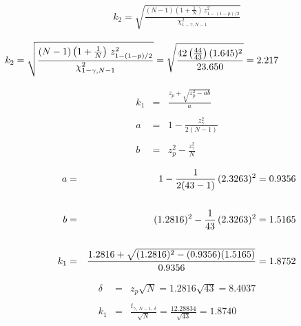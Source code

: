 \documentclass[12pt]{article}
\begin{document}
\pagestyle{empty}
\Large
{}
\pagecolor{ehandbook}

\boldmath 

\vspace*{-1.75in}

\begin{eqnarray*}
k_2 = \sqrt{\frac{(N-1)\left(1 + \frac{1}{N}\right) \, z^2_{1-(1-p)/2}}{\chi^2_{1-\gamma, N-1}}}
\end{eqnarray*}

\vspace*{.25in}

\begin{eqnarray*}
\hspace*{-1in}
k_2 = \sqrt{\frac{(N-1)\left(1 + \frac{1}{N}\right) \, z^2_{1-(1-p)/2}}{\chi^2_{1-\gamma, N-1}}} =\sqrt{\frac{42\left(\frac{44}{43}\right) (1.645)^2}{23.650}} = 2.217
\end{eqnarray*}

\vspace*{.25in}

\begin{eqnarray*}
k_{1} & = & \frac{z_{p} + \sqrt{z_{p}^2 - ab}} {a} \\
      &   & \\
a & = & 1 - \frac{z_{\gamma}^2}{2(N-1)}  \\
      &   & \\
b & = & z_{p}^2 - \frac{ z_{\gamma}^2}{N} \,
\end{eqnarray*}

\vspace*{.25in}

\begin{eqnarray*}
\hspace*{-2in}
a     & = & 1 - \frac{1}{2(43-1)} \, (2.3263)^2 = 0.9356\\
      &   &    \\
b     & = & (1.2816)^2 - \frac{1}{43} \, (2.3263)^2 = 1.5165\\
      &   &    \\
k_{1} & = & \frac{1.2816 + \sqrt{(1.2816)^2 - (0.9356)(1.5165)}} {0.9356} = 1.8752 
\end{eqnarray*}

\vspace*{.25in}

\begin{eqnarray*}
\delta & = & z_{p} \sqrt{N} = 1.2816 \sqrt{43} = 8.4037 \\
       &   & \\
k_1      & = & \frac{ t_{\gamma, \, N-1, \, \delta} }{ \sqrt{N} } = \frac{12.28834}{\sqrt{43}} = 1.8740
\end{eqnarray*}
\end{document}
